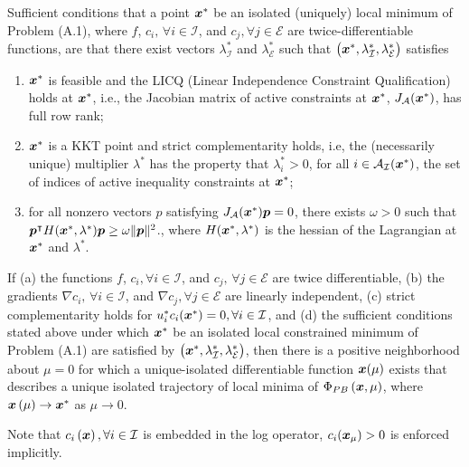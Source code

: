 \begin{theorem}
	Sufficient conditions that a point $\boldsymbol{x}^*$ be an isolated (uniquely) local minimum of Problem (A.1), where $f$, $c_i, \, \forall i \in \mathcal{I}$, and $c_j, \forall j \in \mathcal{E}$ are twice-differentiable functions, are that there exist vectors $\lambda_{\mathcal{I}}^*$ and $\lambda_{\mathcal{E}}^*$ such that $\left(\boldsymbol{x}^*, \lambda_{\mathcal{I}}^*, \lambda_{\mathcal{E}}^*\right)$ satisfies
	\begin{enumerate}
		\item $\boldsymbol{x}^*$ is feasible and the LICQ (Linear Independence Constraint Qualification) holds at $\boldsymbol{x}^*$, i.e., the Jacobian matrix of active constraints at $\boldsymbol{x}^*$, $J_{\mathcal{A}}(\boldsymbol{x}^*)$, has full row rank;
		\item $\boldsymbol{x}^*$ is a KKT point and strict complementarity holds, i.e, the (necessarily unique) multiplier $\lambda^*$ has the property that $\lambda_i^* > 0$, for all $i  \in \mathcal{A}_{\mathcal{I}}(\boldsymbol{x}^*)$, the set of indices of active inequality constraints at $\boldsymbol{x}^*$;
		\item for all nonzero vectors $p$ satisfying $J_{\mathcal{A}}(\boldsymbol{x}^*)\boldsymbol{p} = 0$, there exists $\omega > 0$ such that $\boldsymbol{p}^{\intercal}H(\boldsymbol{x}^*, \lambda^*) \boldsymbol{p} \ge \omega \|\boldsymbol{p}\|^2$., where $H(\boldsymbol{x}^*, \lambda^*) $ is the hessian of the Lagrangian at $\boldsymbol{x}^*$ and $\lambda^*$.
	\end{enumerate}
\end{theorem}
\begin{theorem}
	If (a) the functions $f$, $c_i, \forall i \in \mathcal{I}$, and $c_j, \,\forall j \in \mathcal{E}$ are twice differentiable, (b) the gradients $\nabla c_i, \,\forall i \in \mathcal{I}$, and $\nabla c_j, \forall j \in \mathcal{E}$ are linearly independent, (c) strict complementarity holds for  $u_i^* c_i (\boldsymbol{x}^*) = 0, \forall i \in \mathcal{I}$, and (d) the sufficient conditions stated above under which $\boldsymbol{x}^*$ be an isolated local constrained minimum of Problem (A.1) are satisfied by $\left(\boldsymbol{x}^*, \lambda_{\mathcal{I}}^*, \lambda_{\mathcal{E}}^*\right)$, then there is a positive neighborhood about $\mu = 0$ for which a unique-isolated differentiable function $\boldsymbol{x}(\mu)$ exists that describes a unique isolated trajectory of local minima of $\Phi_{PB}\left(\boldsymbol{x}, \mu\right)$, where $\boldsymbol{x}\left(\mu\right) \to \boldsymbol{x}^*$ as $\mu \to 0$.
\end{theorem}
Note that $c_i\left(\boldsymbol{x}\right), \forall i \in \mathcal{I}$ is embedded  in the log operator, $c_i(\boldsymbol{x}_\mu)> 0$ is enforced implicitly.
